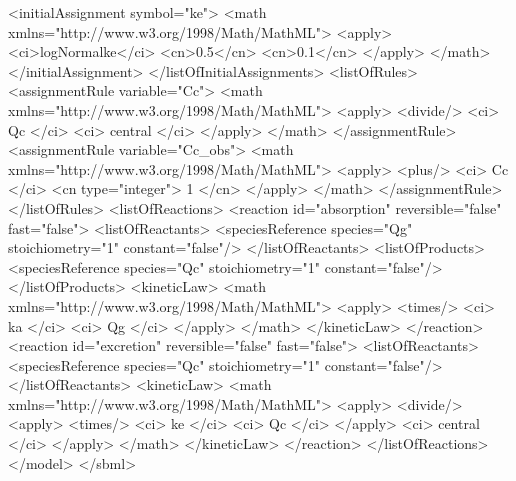 \documentclass[draftspec]{sbmlpkgspec}
\begin{document}
\begin{example}
            <initialAssignment symbol="ke">
                <math xmlns="http://www.w3.org/1998/Math/MathML"> 
                    <apply>
                        <ci>logNormalke</ci>
                        <cn>0.5</cn>
                        <cn>0.1</cn>
                    </apply>
                </math>
            </initialAssignment>
        </listOfInitialAssignments>
        <listOfRules>
            <assignmentRule variable="Cc">
                <math xmlns="http://www.w3.org/1998/Math/MathML">
                    <apply>
                        <divide/>
                        <ci> Qc </ci>
                        <ci> central </ci>
                    </apply>
                </math>
            </assignmentRule>
            <assignmentRule variable="Cc_obs">
                <math xmlns="http://www.w3.org/1998/Math/MathML">
                    <apply>
                        <plus/>
                        <ci> Cc </ci>
                        <cn type="integer"> 1 </cn>
                    </apply>
                </math>
            </assignmentRule>
        </listOfRules>
        <listOfReactions>
            <reaction id="absorption" reversible="false" fast="false">
                <listOfReactants>
                    <speciesReference species="Qg" stoichiometry="1" constant="false"/>
                </listOfReactants>
                <listOfProducts>
                    <speciesReference species="Qc" stoichiometry="1" constant="false"/>
                </listOfProducts>
                <kineticLaw>
                    <math xmlns="http://www.w3.org/1998/Math/MathML">
                        <apply>
                            <times/>
                            <ci> ka </ci>
                            <ci> Qg </ci>
                        </apply>
                    </math>
                </kineticLaw>
            </reaction>
            <reaction id="excretion" reversible="false" fast="false">
                <listOfReactants>
                    <speciesReference species="Qc" stoichiometry="1" constant="false"/>
                </listOfReactants>
                <kineticLaw>
                    <math xmlns="http://www.w3.org/1998/Math/MathML">
                        <apply>
                            <divide/>
                            <apply>
                                <times/>
                                <ci> ke </ci>
                                <ci> Qc </ci>
                            </apply>
                            <ci> central </ci>
                        </apply>
                    </math>
                </kineticLaw>
            </reaction>
        </listOfReactions>
    </model>
</sbml>\end{example}
\end{document}
